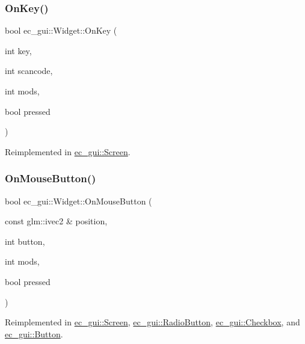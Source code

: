\subsubsection{\texorpdfstring{On\+Key()}{OnKey()}}
{\footnotesize\ttfamily bool ec\+\_\+gui\+::\+Widget\+::\+On\+Key (\begin{DoxyParamCaption}\item[{int}]{key,  }\item[{int}]{scancode,  }\item[{int}]{mods,  }\item[{bool}]{pressed }\end{DoxyParamCaption})\hspace{0.3cm}{\ttfamily [virtual]}}



Reimplemented in \mbox{\hyperlink{classec__gui_1_1_screen_a17f251d79b8e3d07658c37768f1572d3}{ec\+\_\+gui\+::\+Screen}}.

\mbox{\label{classec__gui_1_1_widget_a00bff8173079cc1cb69ec84910715ffb}} 
\subsubsection{\texorpdfstring{On\+Mouse\+Button()}{OnMouseButton()}}
{\footnotesize\ttfamily bool ec\+\_\+gui\+::\+Widget\+::\+On\+Mouse\+Button (\begin{DoxyParamCaption}\item[{const glm\+::ivec2 \&}]{position,  }\item[{int}]{button,  }\item[{int}]{mods,  }\item[{bool}]{pressed }\end{DoxyParamCaption})\hspace{0.3cm}{\ttfamily [virtual]}}



Reimplemented in \mbox{\hyperlink{classec__gui_1_1_screen_a2d13abce5d8f8e8332f15949db18c374}{ec\+\_\+gui\+::\+Screen}}, \mbox{\hyperlink{classec__gui_1_1_radio_button_a40837f7fe8a630e42a2c8778689f2463}{ec\+\_\+gui\+::\+Radio\+Button}}, \mbox{\hyperlink{classec__gui_1_1_checkbox_a0c109bc8ddf9b272857e71cec9b63b49}{ec\+\_\+gui\+::\+Checkbox}}, and \mbox{\hyperlink{classec__gui_1_1_button_a9df65865d810e2ba198905cdf691f9be}{ec\+\_\+gui\+::\+Button}}.

